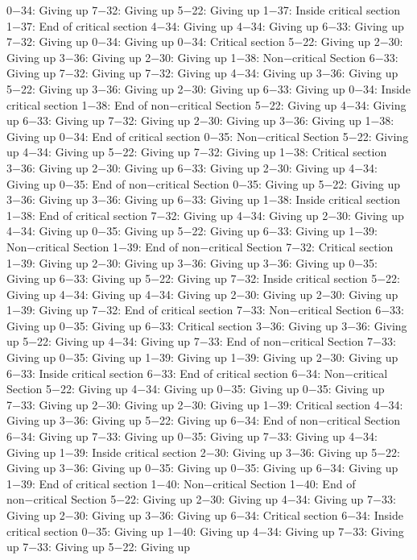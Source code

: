 0−34: Giving up
7−32: Giving up
5−22: Giving up
1−37: Inside critical section
1−37: End of critical section
4−34: Giving up
4−34: Giving up
6−33: Giving up
7−32: Giving up
0−34: Giving up
0−34: Critical section
5−22: Giving up
2−30: Giving up
3−36: Giving up
2−30: Giving up
1−38: Non−critical Section
6−33: Giving up
7−32: Giving up
7−32: Giving up
4−34: Giving up
3−36: Giving up
5−22: Giving up
3−36: Giving up
2−30: Giving up
6−33: Giving up
0−34: Inside critical section
1−38: End of non−critical Section
5−22: Giving up
4−34: Giving up
6−33: Giving up
7−32: Giving up
2−30: Giving up
3−36: Giving up
1−38: Giving up
0−34: End of critical section
0−35: Non−critical Section
5−22: Giving up
4−34: Giving up
5−22: Giving up
7−32: Giving up
1−38: Critical section
3−36: Giving up
2−30: Giving up
6−33: Giving up
2−30: Giving up
4−34: Giving up
0−35: End of non−critical Section
0−35: Giving up
5−22: Giving up
3−36: Giving up
3−36: Giving up
6−33: Giving up
1−38: Inside critical section
1−38: End of critical section
7−32: Giving up
4−34: Giving up
2−30: Giving up
4−34: Giving up
0−35: Giving up
5−22: Giving up
6−33: Giving up
1−39: Non−critical Section
1−39: End of non−critical Section
7−32: Critical section
1−39: Giving up
2−30: Giving up
3−36: Giving up
3−36: Giving up
0−35: Giving up
6−33: Giving up
5−22: Giving up
7−32: Inside critical section
5−22: Giving up
4−34: Giving up
4−34: Giving up
2−30: Giving up
2−30: Giving up
1−39: Giving up
7−32: End of critical section
7−33: Non−critical Section
6−33: Giving up
0−35: Giving up
6−33: Critical section
3−36: Giving up
3−36: Giving up
5−22: Giving up
4−34: Giving up
7−33: End of non−critical Section
7−33: Giving up
0−35: Giving up
1−39: Giving up
1−39: Giving up
2−30: Giving up
6−33: Inside critical section
6−33: End of critical section
6−34: Non−critical Section
5−22: Giving up
4−34: Giving up
0−35: Giving up
0−35: Giving up
7−33: Giving up
2−30: Giving up
2−30: Giving up
1−39: Critical section
4−34: Giving up
3−36: Giving up
5−22: Giving up
6−34: End of non−critical Section
6−34: Giving up
7−33: Giving up
0−35: Giving up
7−33: Giving up
4−34: Giving up
1−39: Inside critical section
2−30: Giving up
3−36: Giving up
5−22: Giving up
3−36: Giving up
0−35: Giving up
0−35: Giving up
6−34: Giving up
1−39: End of critical section
1−40: Non−critical Section
1−40: End of non−critical Section
5−22: Giving up
2−30: Giving up
4−34: Giving up
7−33: Giving up
2−30: Giving up
3−36: Giving up
6−34: Critical section
6−34: Inside critical section
0−35: Giving up
1−40: Giving up
4−34: Giving up
7−33: Giving up
7−33: Giving up
5−22: Giving up
